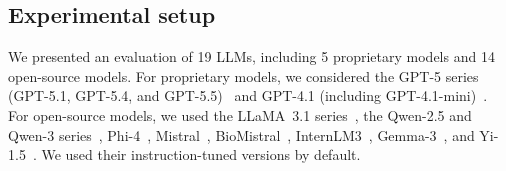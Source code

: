 \subsection{Experimental setup}\label{sec:exp_setup}

We presented an evaluation of 19 LLMs, including 5 proprietary models and 14 open-source models.
For proprietary models, we considered the GPT-5 series (GPT-5.1, GPT-5.4, and GPT-5.5)~\citep{openai2025gpt5} and GPT-4.1 (including GPT-4.1-mini)~\citep{openai2025gpt41}.
For open-source models, we used the LLaMA~3.1 series~\citep{grattafiori2024llama3herdmodels}, the Qwen-2.5 and Qwen-3 series~\citep{qwen2.5,yang2025qwen3}, Phi-4~\citep{abdin2024phi4technicalreport}, Mistral~\citep{jiang2023mistral}, BioMistral~\citep{labrak2024biomistralcollectionopensourcepretrained}, InternLM3~\citep{cai2024internlm2}, Gemma-3~\citep{gemmateam2025gemma3}, and Yi-1.5~\citep{ai2025yiopenfoundationmodels}.
We used their instruction-tuned versions by default.